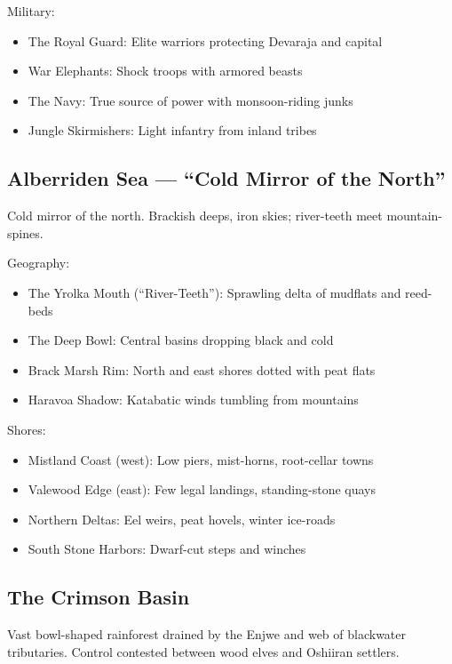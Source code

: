 Military:
\begin{itemize}
    \item The Royal Guard: Elite warriors protecting Devaraja and capital
    \item War Elephants: Shock troops with armored beasts
    \item The Navy: True source of power with monsoon-riding junks
    \item Jungle Skirmishers: Light infantry from inland tribes
\end{itemize}

\subsection{Alberriden Sea --- ``Cold Mirror of the North''}
\label{sec:alberriden}

Cold mirror of the north. Brackish deeps, iron skies; river-teeth meet mountain-spines.

Geography:
\begin{itemize}
    \item The Yrolka Mouth (``River-Teeth''): Sprawling delta of mudflats and reed-beds
    \item The Deep Bowl: Central basins dropping black and cold
    \item Brack Marsh Rim: North and east shores dotted with peat flats
    \item Haravoa Shadow: Katabatic winds tumbling from mountains
\end{itemize}

Shores:
\begin{itemize}
    \item Mistland Coast (west): Low piers, mist-horns, root-cellar towns
    \item Valewood Edge (east): Few legal landings, standing-stone quays
    \item Northern Deltas: Eel weirs, peat hovels, winter ice-roads
    \item South Stone Harbors: Dwarf-cut steps and winches
\end{itemize}

\subsection{The Crimson Basin}
\label{sec:crimsonbasin}

Vast bowl-shaped rainforest drained by the Enjwe and web of blackwater tributaries. Control contested between wood elves and Oshiiran settlers.

